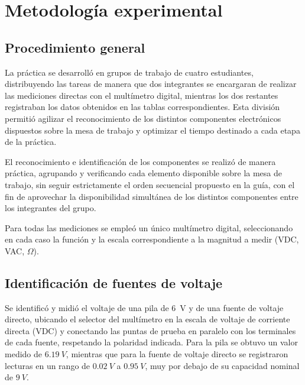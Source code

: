\section{Metodología experimental}

\subsection{Procedimiento general}

La práctica se desarrolló en grupos de trabajo de cuatro estudiantes, distribuyendo las tareas de manera que dos integrantes se encargaran de realizar las mediciones directas con el multímetro digital, mientras los dos restantes registraban los datos obtenidos en las tablas correspondientes. Esta división permitió agilizar el reconocimiento de los distintos componentes electrónicos dispuestos sobre la mesa de trabajo y optimizar el tiempo destinado a cada etapa de la práctica.

El reconocimiento e identificación de los componentes se realizó de manera práctica, agrupando y verificando cada elemento disponible sobre la mesa de trabajo, sin seguir estrictamente el orden secuencial propuesto en la guía, con el fin de aprovechar la disponibilidad simultánea de los distintos componentes entre los integrantes del grupo.

Para todas las mediciones se empleó un único multímetro digital, seleccionando en cada caso la función y la escala correspondiente a la magnitud a medir (VDC, VAC, $\Omega$).

\subsection{Identificación de fuentes de voltaje}

Se identificó y midió el voltaje de una pila de 6~V y de una fuente de voltaje directo, ubicando el selector del multímetro en la escala de voltaje de corriente directa (VDC) y conectando las puntas de prueba en paralelo con los terminales de cada fuente, respetando la polaridad indicada. Para la pila se obtuvo un valor medido de $6.19~V$, mientras que para la fuente de voltaje directo se registraron lecturas en un rango de $0.02~V$ a $0.95~V$, muy por debajo de su capacidad nominal de $9~V$.


